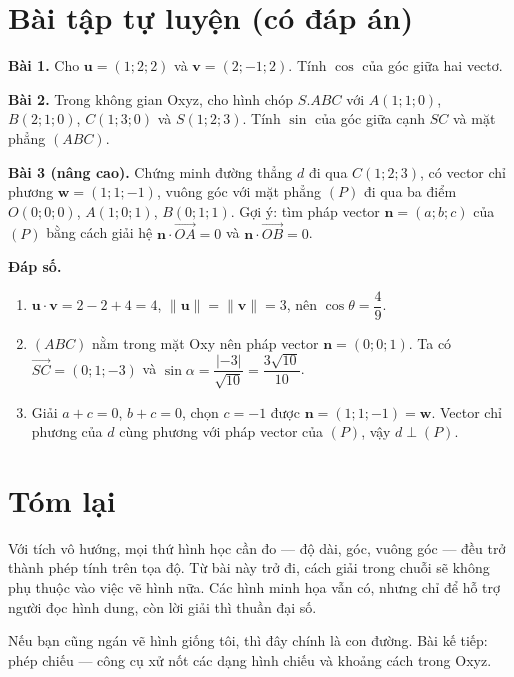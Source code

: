 \documentclass[12pt,a4paper]{article}
\begin{document}
\section{Bài tập tự luyện (có đáp án)}

\textbf{Bài 1.} Cho $\mathbf{u} = (1;2;2)$ và $\mathbf{v} = (2;-1;2)$. Tính $\cos$ của góc giữa hai vectơ.

\textbf{Bài 2.} Trong không gian Oxyz, cho hình chóp $S.ABC$ với $A(1;1;0)$, $B(2;1;0)$, $C(1;3;0)$ và $S(1;2;3)$. Tính $\sin$ của góc giữa cạnh $SC$ và mặt phẳng $(ABC)$.

\textbf{Bài 3 (nâng cao).} Chứng minh đường thẳng $d$ đi qua $C(1;2;3)$, có vector chỉ phương $\mathbf{w}=(1;1;-1)$, vuông góc với mặt phẳng $(P)$ đi qua ba điểm $O(0;0;0)$, $A(1;0;1)$, $B(0;1;1)$. Gợi ý: tìm pháp vector $\mathbf{n}=(a;b;c)$ của $(P)$ bằng cách giải hệ $\mathbf{n}\cdot\overrightarrow{OA} = 0$ và $\mathbf{n}\cdot\overrightarrow{OB} = 0$.

\textbf{Đáp số.}

\begin{enumerate}
  \item $\mathbf{u}\cdot\mathbf{v} = 2-2+4 = 4$, $\|\mathbf{u}\| = \|\mathbf{v}\| = 3$, nên $\cos\theta = \dfrac{4}{9}$.
  \item $(ABC)$ nằm trong mặt Oxy nên pháp vector $\mathbf{n}=(0;0;1)$. Ta có $\overrightarrow{SC}=(0;1;-3)$ và $\sin\alpha = \dfrac{|-3|}{\sqrt{10}} = \dfrac{3\sqrt{10}}{10}$.
  \item Giải $a+c=0$, $b+c=0$, chọn $c=-1$ được $\mathbf{n}=(1;1;-1)=\mathbf{w}$. Vector chỉ phương của $d$ cùng phương với pháp vector của $(P)$, vậy $d \perp (P)$.
\end{enumerate}

\section{Tóm lại}

Với tích vô hướng, mọi thứ hình học cần đo --- độ dài, góc, vuông góc --- đều trở thành phép tính trên tọa độ. Từ bài này trở đi, cách giải trong chuỗi sẽ không phụ thuộc vào việc vẽ hình nữa. Các hình minh họa vẫn có, nhưng chỉ để hỗ trợ người đọc hình dung, còn lời giải thì thuần đại số.

Nếu bạn cũng ngán vẽ hình giống tôi, thì đây chính là con đường. Bài kế tiếp: phép chiếu --- công cụ xử nốt các dạng hình chiếu và khoảng cách trong Oxyz.
\end{document}
